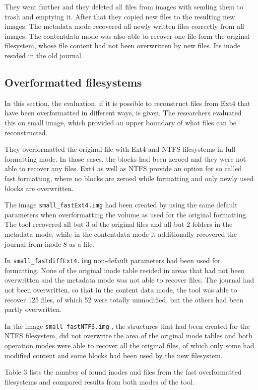 \documentclass{acm_proc_article-sp}
\begin{document}
They went further and they deleted all files from images with sending them to trash and emptying it. After that they copied new files to the resulting new images. The metadata mode recovered all newly written files correctly from all images. The contentdata mode was also able to recover one file form the original filesystem, whose file content had not been overwritten by new files. Its inode resided in the old journal.


\subsection{Overformatted filesystems}

In this section, the evaluation, if it is possible to reconstruct files from Ext4 that have been overformatted in different ways, is given. The researchers evaluated this on small image, which provided an upper boundary of what files can be reconstructed.

They overformatted the original file with Ext4 and NTFS filesystems in full formatting mode. In those cases, the blocks had been zeroed and they were not able to recover any files. Ext4 as well as NTFS provide an option for so called fast formatting, where no blocks are zeroed while formatting and only newly used blocks are overwritten.

The image \texttt{small\_fastExt4.img} 
 had been created by using the same default parameters when overformatting the volume as used for the original formatting. The tool recovered all but 3 of the original files and all but 2 folders in the metadata mode, while in the contentdata mode it additionally recovered the journal from inode 8 as a file.

In \texttt{small\_fastdiffExt4.img} non-default parameters had been used 
 for formatting. None of the original inode table resided in areas that had not been overwritten and the metadata mode was not able to recover files. The journal had not been overwritten, so that in the content data mode, the tool was able to recover 125 files, of which 52 were totally unmodified, but the others had been partly overwritten.

In the image 
\texttt{small\_fastNTFS.img}
, the structures that had been created for the NTFS filesystem, did not overwrite the area of the original inode tables and both operation modes were able to recover all the original files, of which only some had modified content and some blocks had been used by the new filesystem.

Table 3 lists the number of found inodes and files from the fast overformatted filesystems and compared results from both modes of the tool.
\end{document}
